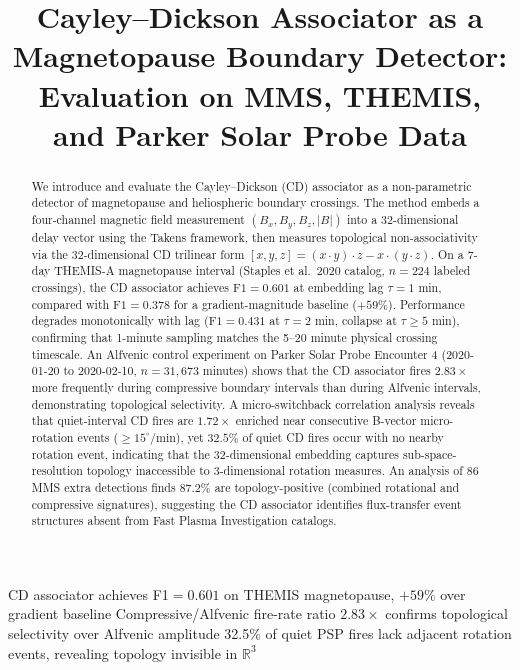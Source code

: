 \documentclass[draft]{agujournal2025}
\begin{document}

\title{Cayley--Dickson Associator as a Magnetopause Boundary Detector:\\
       Evaluation on MMS, THEMIS, and Parker Solar Probe Data}


\keypoints
  {CD associator achieves F1$=0.601$ on THEMIS magnetopause, $+59\%$ over gradient baseline}
  {Compressive/Alfvenic fire-rate ratio $2.83\times$ confirms topological selectivity over Alfvenic amplitude}
  {32.5\% of quiet PSP fires lack adjacent rotation events, revealing topology invisible in $\mathbb{R}^3$}

\maketitle

\begin{abstract}
We introduce and evaluate the Cayley--Dickson (CD) associator as a
non-parametric detector of magnetopause and heliospheric boundary crossings.
The method embeds a four-channel magnetic field measurement
$(B_x, B_y, B_z, |B|)$ into a 32-dimensional delay vector using the
Takens framework, then measures topological non-associativity via the
32-dimensional CD trilinear form $[x,y,z] = (x \cdot y) \cdot z - x \cdot (y \cdot z)$.
On a 7-day THEMIS-A magnetopause interval (Staples et al.\ 2020 catalog,
$n=224$ labeled crossings), the CD associator achieves
$\mathrm{F1}=0.601$ at embedding lag $\tau = 1$ min, compared with
$\mathrm{F1}=0.378$ for a gradient-magnitude baseline ($+59\%$).
Performance degrades monotonically with lag ($\mathrm{F1}=0.431$ at $\tau=2$ min,
collapse at $\tau \geq 5$ min), confirming that 1-minute sampling matches the
5--20 minute physical crossing timescale.
An Alfvenic control experiment on Parker Solar Probe Encounter 4
(2020-01-20 to 2020-02-10, $n=31{,}673$ minutes) shows that the CD associator
fires $2.83\times$ more frequently during compressive boundary intervals than
during Alfvenic intervals, demonstrating topological selectivity.
A micro-switchback correlation analysis reveals that quiet-interval CD fires are
$1.72\times$ enriched near consecutive B-vector micro-rotation events
($\geq 15^{\circ}/\mathrm{min}$), yet $32.5\%$ of quiet CD fires occur with
no nearby rotation event, indicating that the 32-dimensional embedding captures
sub-space-resolution topology inaccessible to 3-dimensional rotation measures.
An analysis of 86 MMS extra detections finds $87.2\%$ are topology-positive
(combined rotational and compressive signatures), suggesting the CD associator
identifies flux-transfer event structures absent from Fast Plasma Investigation
catalogs.
\end{abstract}
\end{document}
